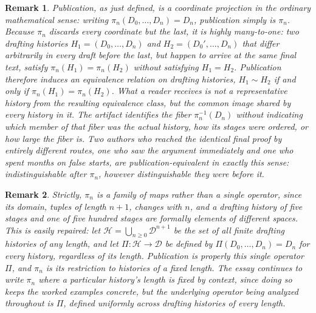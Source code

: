 \documentclass[11pt]{article}
\newtheorem{remark}{Remark}
\begin{document}
\begin{remark}
Publication, as just defined, is a coordinate projection in the ordinary mathematical sense: writing $\pi_n(D_0, \ldots, D_n) = D_n$, publication simply is $\pi_n$. Because $\pi_n$ discards every coordinate but the last, it is highly many-to-one: two drafting histories $H_1 = (D_0, \ldots, D_n)$ and $H_2 = (D_0', \ldots, D_n)$ that differ arbitrarily in every draft before the last, but happen to arrive at the same final text, satisfy $\pi_n(H_1) = \pi_n(H_2)$ without satisfying $H_1 = H_2$. Publication therefore induces an equivalence relation on drafting histories, $H_1 \sim H_2$ if and only if $\pi_n(H_1) = \pi_n(H_2)$. What a reader receives is not a representative history from the resulting equivalence class, but the common image shared by every history in it. The artifact identifies the fiber $\pi_n^{-1}(D_n)$ without indicating which member of that fiber was the actual history, how its stages were ordered, or how large the fiber is. Two authors who reached the identical final proof by entirely different routes, one who saw the argument immediately and one who spent months on false starts, are publication-equivalent in exactly this sense: indistinguishable after $\pi_n$, however distinguishable they were before it.
\end{remark}

\begin{remark}
Strictly, $\pi_n$ is a family of maps rather than a single operator, since its domain, tuples of length $n+1$, changes with $n$, and a drafting history of five stages and one of five hundred stages are formally elements of different spaces. This is easily repaired: let $\mathcal{H} = \bigcup_{n \geq 0} \mathcal{D}^{n+1}$ be the set of all finite drafting histories of any length, and let $\Pi : \mathcal{H} \to \mathcal{D}$ be defined by $\Pi(D_0, \ldots, D_n) = D_n$ for every history, regardless of its length. Publication is properly this single operator $\Pi$, and $\pi_n$ is its restriction to histories of a fixed length. The essay continues to write $\pi_n$ where a particular history's length is fixed by context, since doing so keeps the worked examples concrete, but the underlying operator being analyzed throughout is $\Pi$, defined uniformly across drafting histories of every length.
\end{remark}
\end{document}
